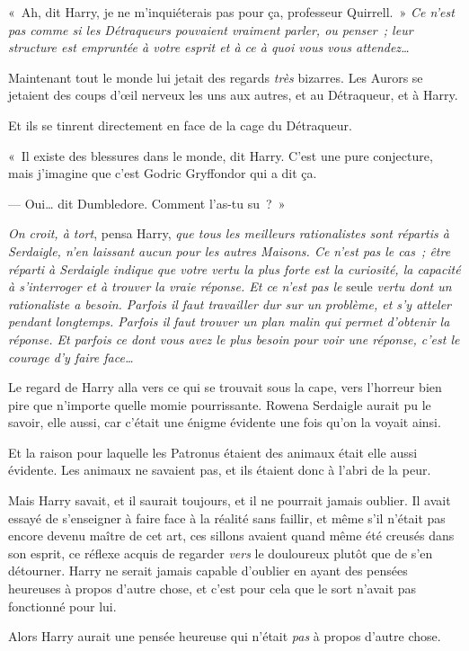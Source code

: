 «~Ah, dit Harry, je ne m'inquiéterais pas pour ça, professeur Quirrell.~» \emph{Ce n'est pas comme si les Détraqueurs pouvaient vraiment parler, ou penser~; leur structure est empruntée à votre esprit et à ce à quoi vous vous attendez…}

Maintenant tout le monde lui jetait des regards \emph{très} bizarres. Les Aurors se jetaient des coups d'œil nerveux les uns aux autres, et au Détraqueur, et à Harry.

Et ils se tinrent directement en face de la cage du Détraqueur.

«~Il existe des blessures dans le monde, dit Harry. C'est une pure conjecture, mais j'imagine que c'est Godric Gryffondor qui a dit ça.

--- Oui… dit Dumbledore. Comment l'as-tu su~?~»

\emph{On croit, à tort}, pensa Harry, \emph{que tous les meilleurs rationalistes sont répartis à Serdaigle, n'en laissant aucun pour les autres Maisons. Ce n'est pas le cas~; être réparti à Serdaigle indique que votre vertu la plus forte est la curiosité, la capacité à s'interroger et à trouver la vraie réponse. Et ce n'est pas le} seule \emph{vertu dont un rationaliste a besoin. Parfois il faut travailler dur sur un problème, et s'y atteler pendant longtemps. Parfois il faut trouver un plan malin qui permet d'obtenir la réponse. Et parfois ce dont vous avez le plus besoin pour voir une réponse, c'est le courage d'y faire face…}

Le regard de Harry alla vers ce qui se trouvait sous la cape, vers l'horreur bien pire que n'importe quelle momie pourrissante. Rowena Serdaigle aurait pu le savoir, elle aussi, car c'était une énigme évidente une fois qu'on la voyait ainsi.

Et la raison pour laquelle les Patronus étaient des animaux était elle aussi évidente. Les animaux ne savaient pas, et ils étaient donc à l'abri de la peur.

Mais Harry savait, et il saurait toujours, et il ne pourrait jamais oublier. Il avait essayé de s'enseigner à faire face à la réalité sans faillir, et même s'il n'était pas encore devenu maître de cet art, ces sillons avaient quand même été creusés dans son esprit, ce réflexe acquis de regarder \emph{vers} le douloureux plutôt que de s'en détourner. Harry ne serait jamais capable d'oublier en ayant des pensées heureuses à propos d'autre chose, et c'est pour cela que le sort n'avait pas fonctionné pour lui.

Alors Harry aurait une pensée heureuse qui n'était \emph{pas} à propos d'autre chose.

